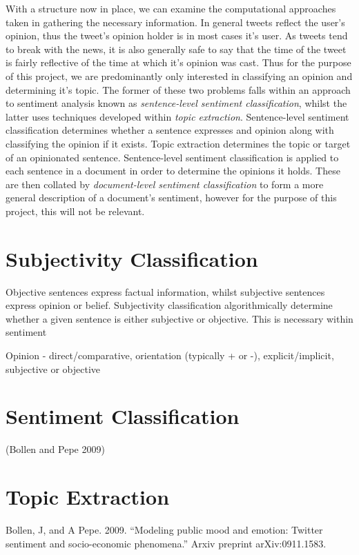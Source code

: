 With a structure now in place, we can examine the computational approaches taken in gathering the necessary information. In general tweets reflect the user's opinion, thus the tweet's opinion holder is in most cases it's user. As tweets tend to break with the news, it is also generally safe to say that the time of the tweet is fairly reflective of the time at which it's opinion was cast. Thus for the purpose of this project, we are predominantly only interested in classifying an opinion and determining it's topic. The former of these two problems falls within an approach to sentiment analysis known as \emph{sentence-level sentiment classification}, whilst the latter uses techniques developed within \emph{topic extraction}. Sentence-level sentiment classification determines whether a sentence expresses and opinion along with classifying the opinion if it exists. Topic extraction determines the topic or target of an opinionated sentence. Sentence-level sentiment classification is applied to each sentence in a document in order to determine the opinions it holds. These are then collated by \emph{document-level sentiment classification} to form a more general description of a document's sentiment, however for the purpose of this project, this will not be relevant. 

\section{Subjectivity Classification}
\label{background:subjectivity_classification}

Objective sentences express factual information, whilst subjective sentences express opinion or belief. Subjectivity classification algorithmically determine whether a given sentence is either subjective or objective. This is necessary within sentiment 

Opinion - direct/comparative, orientation (typically + or -), explicit/implicit, subjective or objective

\section{Sentiment Classification}
\label{background:sentiment_classification}
(Bollen and Pepe 2009)



\section{Topic Extraction}
\label{background:topic_extraction}

Bollen, J, and A Pepe. 2009. “Modeling public mood and emotion: Twitter sentiment and socio-economic phenomena.” Arxiv preprint arXiv:0911.1583.
